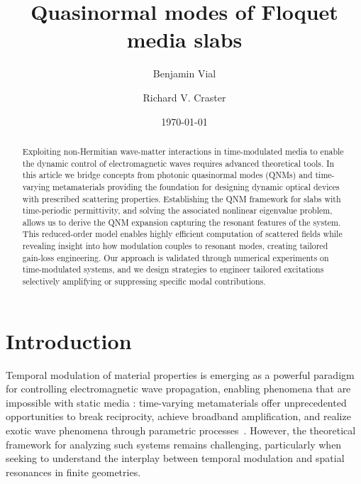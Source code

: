 \documentclass[%
 reprint,
 amsmath,amssymb,
 aps,
 prb,
]{revtex4-2}
\begin{document}
\title{Quasinormal modes of Floquet media slabs}
\author{Benjamin Vial}
\author{Richard V. Craster}
\date{\today}

\begin{abstract}
Exploiting non-Hermitian wave-matter interactions in time-modulated media to enable the dynamic control of electromagnetic waves requires advanced theoretical tools. In this article we bridge concepts from photonic quasinormal modes (QNMs) and time-varying metamaterials providing the foundation for designing dynamic optical devices with prescribed scattering properties. Establishing the QNM framework for slabs with time-periodic permittivity, and solving the associated nonlinear eigenvalue problem, allows us to derive the QNM expansion capturing the resonant features of the system. This reduced-order model enables highly efficient computation of scattered fields while revealing insight into how modulation couples to resonant modes, creating tailored gain-loss engineering. Our approach is validated through numerical experiments on time-modulated systems, and we design strategies to engineer tailored excitations selectively amplifying or suppressing specific modal contributions.
\end{abstract}


\maketitle

\section{\label{sec:intro}Introduction}


Temporal modulation of material properties is emerging as a powerful paradigm for controlling electromagnetic wave propagation, enabling phenomena that are impossible with static media \cite{Galiffi2022photonics, PachecoPena2022, monticone2025}: time-varying metamaterials offer unprecedented opportunities to break reciprocity, achieve broadband amplification, and realize exotic wave phenomena through parametric processes~\cite{Caloz2019temporal, Yu2021complete}. However, the theoretical framework for analyzing such systems remains challenging, particularly when seeking to understand the interplay between temporal modulation and spatial resonances in finite geometries.
\end{document}
